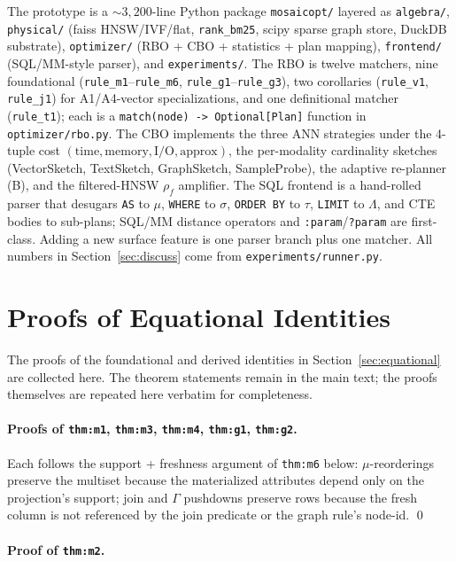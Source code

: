 \documentclass[sigconf]{acmart}
\theoremstyle{plain}
\theoremstyle{definition}
\theoremstyle{remark}
\begin{document}
The prototype is a $\sim 3{,}200$-line Python package
\texttt{mosaicopt/} layered as \texttt{algebra/},
\texttt{physical/} (faiss HNSW/IVF/flat, \texttt{rank\_bm25},
scipy sparse graph store, DuckDB substrate),
\texttt{optimizer/} (RBO + CBO + statistics + plan mapping),
\texttt{frontend/} (SQL/MM-style parser), and
\texttt{experiments/}. The RBO is twelve matchers, nine
foundational (\texttt{rule\_m1}--\texttt{rule\_m6},
\texttt{rule\_g1}--\texttt{rule\_g3}), two corollaries
(\texttt{rule\_v1}, \texttt{rule\_j1}) for A1/A4-vector
specializations, and one definitional matcher (\texttt{rule\_t1});
each is a \texttt{match(node) -> Optional[Plan]} function in
\texttt{optimizer/rbo.py}. The CBO implements the three ANN
strategies under the 4-tuple cost
$(\mathrm{time}, \mathrm{memory}, \mathrm{I/O}, \mathrm{approx})$,
the per-modality cardinality sketches (VectorSketch, TextSketch,
GraphSketch, SampleProbe), the adaptive re-planner (B), and the
filtered-HNSW $\rho_f$ amplifier. The SQL frontend is a
hand-rolled parser that desugars \texttt{AS} to $\mu$,
\texttt{WHERE} to $\sigma$, \texttt{ORDER BY} to $\tau$,
\texttt{LIMIT} to $\Lambda$, and CTE bodies to sub-plans;
SQL/MM distance operators and \texttt{:param}/\texttt{?param} are
first-class. Adding a new surface feature is one parser branch
plus one matcher. All numbers in Section~\ref{sec:discuss} come
from \texttt{experiments/runner.py}.
\section{Proofs of Equational Identities}\label{app:proofs}

The proofs of the foundational and derived identities in
Section~\ref{sec:equational} are collected here.  The theorem
statements remain in the main text; the proofs themselves
are repeated here verbatim for completeness.

\paragraph{Proofs of \texttt{thm:m1}, \texttt{thm:m3}, \texttt{thm:m4}, \texttt{thm:g1}, \texttt{thm:g2}.}
Each follows the support + freshness argument of \texttt{thm:m6}
below: $\mu$-reorderings preserve the multiset because the
materialized attributes depend only on the projection's
support; join and $\Gamma$ pushdowns preserve rows because the
fresh column is not referenced by the join predicate or the
graph rule's node-id. \qed


\paragraph{Proof of \texttt{thm:m2}.}
\end{document}
